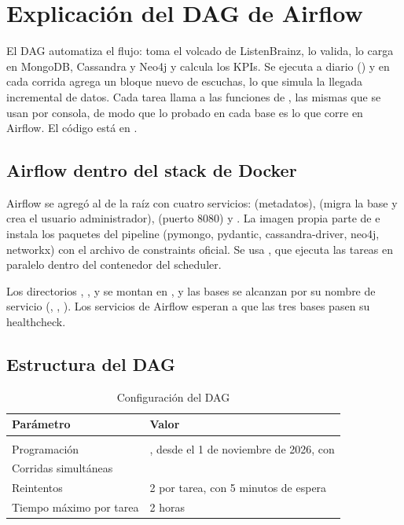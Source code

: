 \section{Explicación del DAG de Airflow}
\label{cap:airflow}

El DAG  automatiza el flujo: toma el volcado de ListenBrainz, lo valida, lo carga en MongoDB, Cassandra y Neo4j y calcula los KPIs. Se ejecuta a diario () y en cada corrida agrega un bloque nuevo de escuchas, lo que simula la llegada incremental de datos. Cada tarea llama a las funciones de , las mismas que se usan por consola, de modo que lo probado en cada base es lo que corre en Airflow. El código está en .

\subsection{Airflow dentro del stack de Docker}

Airflow se agregó al  de la raíz con cuatro servicios:  (metadatos),  (migra la base y crea el usuario administrador),  (puerto 8080) y . La imagen propia parte de  e instala los paquetes del pipeline (pymongo, pydantic, cassandra-driver, neo4j, networkx) con el archivo de constraints oficial. Se usa , que ejecuta las tareas en paralelo dentro del contenedor del scheduler.

Los directorios , ,  y  se montan en , y las bases se alcanzan por su nombre de servicio (, , ). Los servicios de Airflow esperan a que las tres bases pasen su healthcheck.

\subsection{Estructura del DAG}

\begin{table}[H]
\centering
\caption{Configuración del DAG}
\label{tab:dag-config}
\begin{tabularx}{\textwidth}{l Y}
\toprule
Parámetro & Valor \\
\midrule
{} &  \\
Programación & , desde el 1 de noviembre de 2026, con  \\
Corridas simultáneas &  \\
Reintentos & 2 por tarea, con 5 minutos de espera \\
Tiempo máximo por tarea & 2 horas \\
\bottomrule
\end{tabularx}
\end{table}

